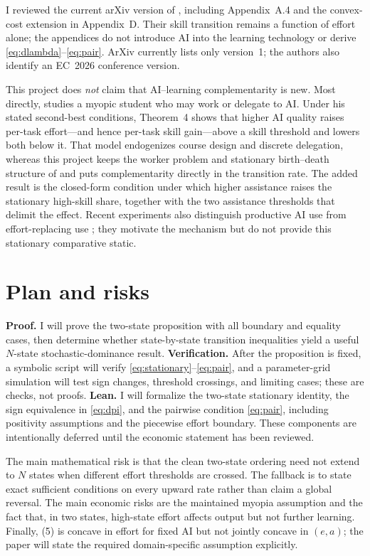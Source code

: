 \documentclass[11pt]{article}
\begin{document}
I reviewed the current arXiv version of \citet{aouad2026paradoxes}, including
Appendix~A.4 and the convex-cost extension in Appendix~D. Their skill
transition remains a function of effort alone; the appendices do not introduce
AI into the learning technology or derive \eqref{eq:dlambda}--\eqref{eq:pair}. ArXiv currently lists
only version~1; the authors also identify an EC~2026 conference version.

This project does \emph{not} claim that AI--learning complementarity is new.
Most directly, \citet{davies2026course} studies a myopic student who may work
or delegate to AI. Under his stated second-best conditions, Theorem~4 shows
that higher AI quality raises per-task effort---and hence per-task skill
gain---above a skill threshold and lowers both below it. That model endogenizes
course design and discrete delegation, whereas this project keeps the worker
problem and stationary birth--death structure of \citet{aouad2026paradoxes}
and puts complementarity directly in the transition rate. The added result is
the closed-form condition under which higher assistance raises the stationary
high-skill share, together with the two assistance thresholds that delimit the
effect.
Recent experiments also distinguish productive AI use from effort-replacing
use \citep{shen2026skill,wu2026assistance}; they motivate the mechanism but do
not provide this stationary comparative static.

\section{Plan and risks}

\textbf{Proof.} I will prove the two-state proposition with all boundary and
equality cases, then determine whether state-by-state transition inequalities
yield a useful $N$-state stochastic-dominance result. \textbf{Verification.}
After the proposition is fixed, a symbolic script will verify
\eqref{eq:stationary}--\eqref{eq:pair}, and a
parameter-grid simulation will test sign changes, threshold crossings, and
limiting cases; these are checks, not proofs. \textbf{Lean.} I will formalize
the two-state stationary identity, the sign equivalence in \eqref{eq:dpi}, and the
pairwise condition \eqref{eq:pair}, including positivity assumptions and the piecewise
effort boundary. These components are intentionally deferred until the
economic statement has been reviewed.

The main mathematical risk is that the clean two-state ordering need not
extend to $N$ states when different effort thresholds are crossed. The fallback
is to state exact sufficient conditions on every upward rate rather than claim
a global reversal. The main economic risks are the maintained myopia assumption
and the fact that, in two states, high-state effort affects output but not
further learning. Finally, (5) is concave in effort for fixed AI but not jointly
concave in $(e,a)$; the paper will state the required domain-specific
assumption explicitly.

\small


\end{document}

